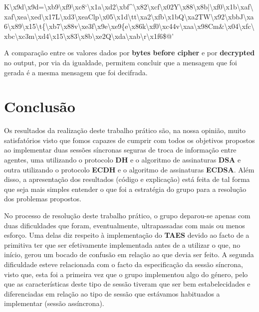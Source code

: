 \documentclass[11pt]{article}
\begin{document}
K\textbackslash{}x9d\textbackslash{}x9d=\textbackslash{}xb9\textbackslash{}xf9\textbackslash{}xc8`\textbackslash{}x1a\textbackslash{}xd2\textbackslash{}xbf\^{}\textbackslash{}x82\textbackslash{}xcf\textbackslash{}x02Y\textbackslash{}x88\textbackslash{}x8b|\textbackslash{}xf0\textbackslash{}x1b\textbackslash{}xaf\textbackslash{}xaf\textbackslash{}xea\textbackslash{}xed\textbackslash{}x17L\textbackslash{}xd3\textbackslash{}xeaClp\textbackslash{}x05\textbackslash{}x1d\textbackslash{}tt\textbackslash{}xa2\textbackslash{}xfb\textbackslash{}x1bQ\textbackslash{}xa2TW\textbackslash{}x92\textbackslash{}xbbJ\textbackslash{}xa6\textbackslash{}x89\textbackslash{}x15\textbackslash{}t\{\textbackslash{}xb7\textbackslash{}x88v\textbackslash{}xe3f\textbackslash{}x9e\textbackslash{}xe9\{e\textbackslash{}x86k\textbackslash{}xf0\textbackslash{}xc44v\textbackslash{}xaa\textbackslash{}x98Cm\&\textbackslash{}x04\textbackslash{}xfc\textbackslash{}xbc\textbackslash{}xc3m\textbackslash{}xd4\textbackslash{}x15\textbackslash{}x83\textbackslash{}x8b\textbackslash{}xe2Q\textbackslash{}xda\textbackslash{}xab\textbackslash{}r\textbackslash{}x1f6\$@'

    A comparação entre os valores dados por \textbf{bytes before cipher} e
por \textbf{decrypted} no output, por via da igualdade, permitem
concluir que a mensagem que foi gerada é a mesma mensagem que foi
decifrada.

    \hypertarget{conclusuxe3o}{%
\section{Conclusão}\label{conclusuxe3o}}

    Os resultados da realização deste trabalho prático são, na nossa
opinião, muito satisfatórios visto que fomos capazes de cumprir com
todos os objetivos propostos ao implementar duas sessões síncronas
seguras de troca de informação entre agentes, uma utilizando o protocolo
\textbf{DH} e o algoritmo de assinaturas \textbf{DSA} e outra utilizando
o protocolo \textbf{ECDH} e o algoritmo de assinaturas \textbf{ECDSA}.
Além disso, a apresentação dos resultados (código e explicação) está
feita de tal forma que seja mais simples entender o que foi a estratégia
do grupo para a resolução dos problemas propostos.

No processo de resolução deste trabalho prático, o grupo deparou-se
apenas com duas dificuldades que foram, eventualmente, ultrapassadas com
mais ou menos esforço. Uma delas diz respeito à implementação do
\textbf{TAES} devido ao facto de a primitiva ter que ser efetivamente
implementada antes de a utilizar o que, no início, gerou um bocado de
confusão em relação ao que devia ser feito. A segunda dificuldade esteve
relacionada com o facto da especificação da sessão síncrona, visto que,
esta foi a primeira vez que o grupo implementou algo do género, pelo que
as características deste tipo de sessão tiveram que ser bem
estabelecidades e diferenciadas em relação ao tipo de sessão que
estávamos habituados a implementar (sessão assíncrona).
\end{document}
